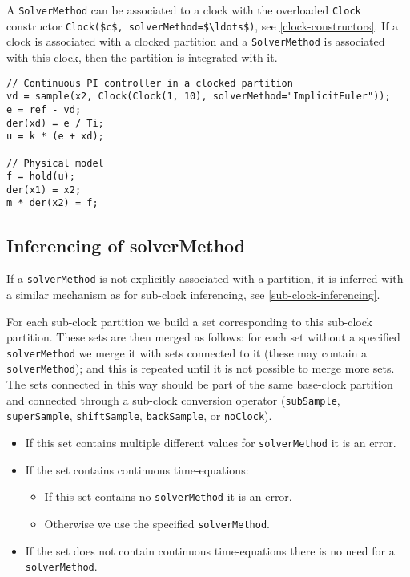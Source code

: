 A \lstinline!SolverMethod! can be associated to a clock with the overloaded \lstinline!Clock! constructor \lstinline!Clock($c$, solverMethod=$\ldots$)!, see \cref{clock-constructors}.
If a clock is associated with a clocked partition and a \lstinline!SolverMethod! is associated with this clock, then the partition is integrated with it.

\begin{example}
\begin{lstlisting}[language=modelica]
// Continuous PI controller in a clocked partition
vd = sample(x2, Clock(Clock(1, 10), solverMethod="ImplicitEuler"));
e = ref - vd;
der(xd) = e / Ti;
u = k * (e + xd);

// Physical model
f = hold(u);
der(x1) = x2;
m * der(x2) = f;
\end{lstlisting}
\end{example}

\subsection{Inferencing of solverMethod}\label{inferencing-of-solvermethod}

If a \lstinline!solverMethod! is not explicitly associated with a partition, it is inferred with a similar mechanism as for sub-clock inferencing, see \cref{sub-clock-inferencing}.

For each sub-clock partition we build a set corresponding to this sub-clock partition.
These sets are then merged as follows: for each set without a specified \lstinline!solverMethod! we merge it with sets connected to it (these may contain a \lstinline!solverMethod!); and this is repeated until it is not possible to merge more sets.
The sets connected in this way should be part of the same base-clock partition and connected through a sub-clock conversion operator (\lstinline!subSample!, \lstinline!superSample!, \lstinline!shiftSample!, \lstinline!backSample!, or \lstinline!noClock!).

\begin{itemize}
\item If this set contains multiple different values for \lstinline!solverMethod! it is an error.
\item If the set contains continuous time-equations:
\begin{itemize}
\item If this set contains no \lstinline!solverMethod! it is an error.
\item Otherwise we use the specified \lstinline!solverMethod!.
\end{itemize}
\item If the set does not contain continuous time-equations there is no need for a \lstinline!solverMethod!.
\end{itemize}

